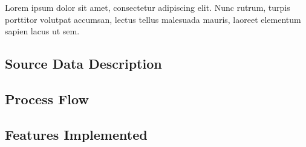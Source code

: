 \documentclass[main_article.tex]{subfiles}
\begin{document}
Lorem ipsum dolor sit amet, consectetur adipiscing elit. Nunc rutrum, turpis porttitor volutpat accumsan, lectus tellus malesuada mauris, laoreet elementum sapien lacus ut sem. \\

\subsection{Source Data Description} \label{subsec:3_imp_source_data}
 

\subsection{Process Flow} \label{subsec:3_process_flow}
 

\subsection{Features Implemented} \label{subsec:3_imp_features}
 
 
\end{document}
